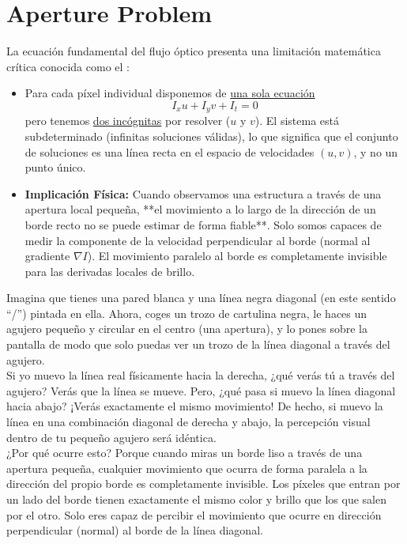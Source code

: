 \section{Aperture Problem}
La ecuación fundamental del flujo óptico presenta una limitación matemática crítica conocida como el : 
\begin{itemize}
    \item Para cada píxel individual disponemos de \underline{una sola ecuación}
    $$I_x u + I_y v + I_t = 0$$
    pero tenemos \underline{dos incógnitas} por resolver ($u$ y $v$). El sistema está subdeterminado (infinitas soluciones válidas), lo que significa que el conjunto de soluciones es una línea recta en el espacio de velocidades $(u, v)$, y no un punto único.
    \item \textbf{Implicación Física:} Cuando observamos una estructura a través de una apertura local pequeña, **el movimiento a lo largo de la dirección de un borde recto no se puede estimar de forma fiable**. Solo somos capaces de medir la componente de la velocidad perpendicular al borde (normal al gradiente $\nabla I$). El movimiento paralelo al borde es completamente invisible para las derivadas locales de brillo.
\end{itemize}

\begin{ejemplo}
    Imagina que tienes una pared blanca y una línea negra diagonal (en este sentido ``/'') pintada en ella. Ahora, coges un trozo de cartulina negra, le haces un agujero pequeño y circular en el centro (una apertura), y lo pones sobre la pantalla de modo que solo puedas ver un trozo de la línea diagonal a través del agujero. \\

    \noindent
    Si yo muevo la línea real físicamente hacia la derecha, ¿qué verás tú a través del agujero? Verás que la línea se mueve. Pero, ¿qué pasa si muevo la línea diagonal hacia abajo? ¡Verás exactamente el mismo movimiento! De hecho, si muevo la línea en una combinación diagonal de derecha y abajo, la percepción visual dentro de tu pequeño agujero será idéntica.\\

    \noindent
    ¿Por qué ocurre esto? Porque cuando miras un borde liso a través de una apertura pequeña, cualquier movimiento que ocurra de forma paralela a la dirección del propio borde es completamente invisible. Los píxeles que entran por un lado del borde tienen exactamente el mismo color y brillo que los que salen por el otro. Solo eres capaz de percibir el movimiento que ocurre en dirección perpendicular (normal) al borde de la línea diagonal.\\
\end{ejemplo}

